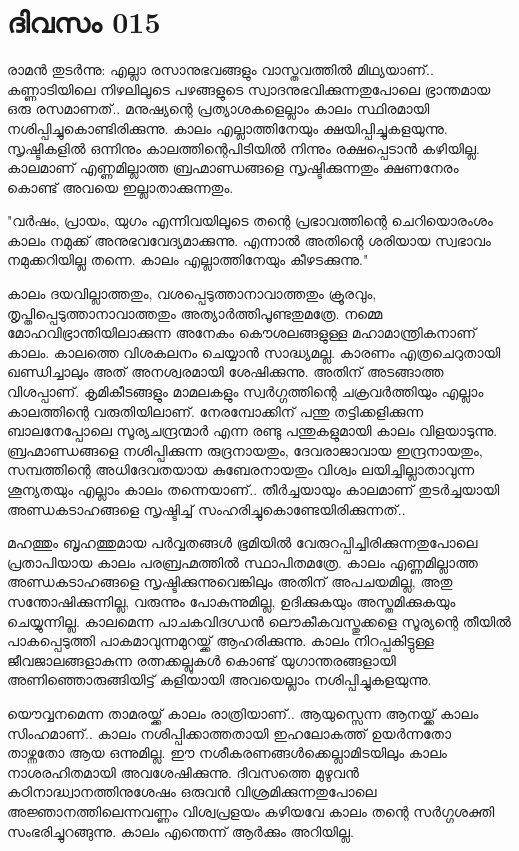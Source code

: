 \newpage
\section{ദിവസം 015}


രാമന്‍ തുടര്‍ന്നു: എല്ലാ രസാനുഭവങ്ങളും വാസ്തവത്തില്‍ മിഥ്യയാണ്‌..  കണ്ണാടിയിലെ നിഴലിലൂടെ പഴങ്ങളുടെ സ്വാദനുഭവിക്കുന്നതുപോലെ ഭ്രാന്തമായ ഒരു രസമാണത്‌..  മനുഷ്യന്റെ പ്രത്യാശകളെല്ലാം കാലം സ്ഥിരമായി നശിപ്പിച്ചുകൊണ്ടിരിക്കുന്നു. കാലം എല്ലാത്തിനേയും ക്ഷയിപ്പിച്ചുകളയുന്നു. സൃഷ്ടികളില്‍ ഒന്നിനും കാലത്തിന്റെപിടിയില്‍ നിന്നും രക്ഷപ്പെടാന്‍ കഴിയില്ല. കാലമാണ്‌ എണ്ണമില്ലാത്ത ബ്രഹ്മാണ്ഡങ്ങളെ സൃഷ്ടിക്കുന്നതും ക്ഷണനേരം കൊണ്ട്‌ അവയെ ഇല്ലാതാക്കുന്നതും. 

"വര്‍ഷം, പ്രായം, യുഗം എന്നിവയിലൂടെ തന്റെ പ്രഭാവത്തിന്റെ ചെറിയൊരംശം കാലം നമുക്ക്‌ അനുഭവവേദ്യമാക്കുന്നു. എന്നാല്‍ അതിന്റെ ശരിയായ സ്വഭാവം നമുക്കറിയില്ല തന്നെ. കാലം എല്ലാത്തിനേയും കീഴടക്കുന്നു."

കാലം ദയവില്ലാത്തതും, വശപ്പെടുത്താനാവാത്തതും ക്രൂരവും, തൃപ്തിപ്പെടുത്താനാവാത്തതും അത്യാര്‍ത്തിപൂണ്ടതുമത്രേ. നമ്മെ മോഹവിഭ്രാന്തിയിലാക്കുന്ന അനേകം കൌശലങ്ങളുള്ള മഹാമാന്ത്രികനാണ്‌ കാലം. കാലത്തെ വിശകലനം ചെയ്യാന്‍ സാദ്ധ്യമല്ല. കാരണം എത്രചെറുതായി ഖണ്ഡിച്ചാലും അത്‌ അനശ്വരമായി ശേഷിക്കുന്നു. അതിന്‌ അടങ്ങാത്ത വിശപ്പാണ്‌. കൃമികീടങ്ങളും മാമലകളും സ്വര്‍ഗ്ഗത്തിന്റെ ചക്രവര്‍ത്തിയും എല്ലാം കാലത്തിന്റെ വരുതിയിലാണ്‌. നേരമ്പോക്കിന്‌ പന്തു തട്ടിക്കളിക്കുന്ന ബാലനേപ്പോലെ സൂര്യചന്ദ്രന്മാര്‍ എന്ന രണ്ടു പന്തുകളുമായി കാലം വിളയാടുന്നു. ബ്രഹ്മാണ്ഡങ്ങളെ നശിപ്പിക്കുന്ന രുദ്രനായതും, ദേവരാജാവായ ഇന്ദ്രനായതും, സമ്പത്തിന്റെ അധിദേവതയായ കുബേരനായതും വിശ്വം ലയിച്ചില്ലാതാവുന്ന ശൂന്യതയും എല്ലാം കാലം തന്നെയാണ്‌..  തീര്‍ച്ചയായും കാലമാണ്‌ തുടര്‍ച്ചയായി അണ്ഡകടാഹങ്ങളെ സൃഷ്ടിച്ച്‌ സംഹരിച്ചുകൊണ്ടേയിരിക്കുന്നത്‌..

മഹത്തും ബൃഹത്തുമായ പര്‍വ്വതങ്ങള്‍ ഭൂമിയില്‍ വേരുറപ്പിച്ചിരിക്കുന്നതുപോലെ പ്രതാപിയായ കാലം പരബ്രഹ്മത്തില്‍ സ്ഥാപിതമത്രേ. കാലം എണ്ണമില്ലാത്ത അണ്ഡകടാഹങ്ങളെ സൃഷ്ടിക്കുന്നുവെങ്കിലും അതിന്‌ അപചയമില്ല, അതു സന്തോഷിക്കുന്നില്ല, വരുന്നും പോകുന്നുമില്ല, ഉദിക്കുകയും അസ്തമിക്കുകയും ചെയ്യുന്നില്ല. കാലമെന്ന പാചകവിദഗ്ധന്‍ ലൌകീകവസ്തുക്കളെ സൂര്യന്റെ തീയില്‍ പാകപ്പെടുത്തി പാകമാവുന്നമുറയ്ക്ക്‌ ആഹരിക്കുന്നു. കാലം നിറപ്പകിട്ടുള്ള ജീവജാലങ്ങളാകുന്ന രത്നക്കല്ലുകള്‍ കൊണ്ട്‌ യുഗാന്തരങ്ങളായി അണിഞ്ഞൊരുങ്ങിയിട്ട്‌ കളിയായി അവയെല്ലാം നശിപ്പിച്ചുകളയുന്നു.

യൌവ്വനമെന്ന താമരയ്ക്ക്‌ കാലം രാത്രിയാണ്‌..  ആയുസ്സെന്ന ആനയ്ക്ക്‌ കാലം സിംഹമാണ്‌.. കാലം നശിപ്പിക്കാത്തതായി ഇഹലോകത്ത്‌ ഉയര്‍ന്നതോ താഴ്ന്നതോ ആയ ഒന്നുമില്ല. ഈ നശീകരണങ്ങള്‍ക്കെല്ലാമിടയിലും കാലം നാശരഹിതമായി അവശേഷിക്കുന്നു. ദിവസത്തെ മുഴുവന്‍ കഠിനാദ്ധ്വാനത്തിനുശേഷം ഒരുവന്‍ വിശ്രമിക്കുന്നതുപോലെ അജ്ഞാനത്തിലെന്നവണ്ണം വിശ്വപ്രളയം കഴിയവേ കാലം തന്റെ സര്‍ഗ്ഗശക്തി സംഭരിച്ചുറങ്ങുന്നു. കാലം എന്തെന്ന് ആര്‍ക്കും അറിയില്ല.
